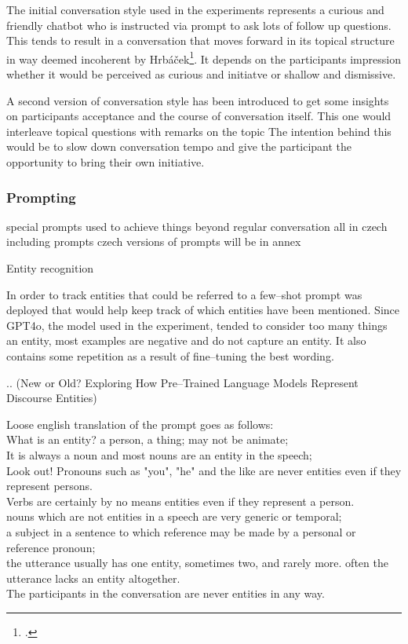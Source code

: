 \documentclass[12pt]{report}
\begin{document}
{\par
The initial conversation style used in the experiments
represents a curious and friendly chatbot
who is instructed via prompt to ask lots of follow up questions.
This tends to result in a conversation that moves forward in its topical structure
in way deemed incoherent by Hrbáček\footcite[p.~30]{hrbacek1994}.
It depends on the participants impression whether it would be perceived as
curious and initiatve or shallow and dismissive.

\par
A second version of conversation style has been introduced
to get some insights on participants acceptance and
the course of conversation itself.
This one would interleave topical questions with remarks on the topic
The intention behind this would be to slow down conversation tempo
and give the participant the opportunity to bring their own initiative.

\subsubsection{Prompting}

special prompts used to achieve things beyond regular conversation
all in czech including prompts
czech versions of prompts will be in annex

\par
Entity recognition

In order to track entities that could be referred to
a few–shot prompt was deployed that would help
keep track of which entities have been mentioned.
Since GPT4o, the model used in the experiment,
tended to consider too many things an entity,
most examples are negative and do not capture an entity.
It also contains some repetition as a result of fine–tuning the best wording.

..
(New or Old? Exploring How Pre–Trained Language Models Represent Discourse Entities)

Loose english translation of the prompt goes as follows:\\
\linespread{1.5}
{\tiny
What is an entity? a person, a thing; may not be animate;\\
 It is always a noun and most nouns are an entity in the speech;\\
 Look out! Pronouns such as "you", "he" and the like are never entities even if they represent persons.\\
 Verbs are certainly by no means entities even if they represent a person.\\
 nouns which are not entities in a speech are very generic or temporal;\\
 a subject in a sentence to which reference may be made by a personal or reference pronoun;\\
 the utterance usually has one entity, sometimes two, and rarely more. often the utterance lacks an entity altogether.\\
 The participants in the conversation are never entities in any way.\\

}}
\end{document}
